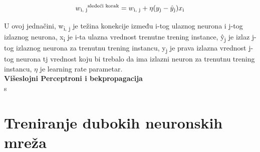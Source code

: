 \documentclass[a4paper,12pt]{report}
\begin{document}
\begin{equation}\label{eq:perceptronlearningrule}
w\textsubscript{i, j}\textsuperscript{sledeći korak} = w\textsubscript{i, j} + \eta (y\textsubscript{j} - \hat{y}\textsubscript{j})x\textsubscript{i}
\end{equation}

U ovoj jednačini, w\textsubscript{i, j} je težina konekcije između i-tog ulaznog neurona i j-tog izlaznog neurona, x\textsubscript{i} je i-ta ulazna vrednost trenutne trening instance, \^y\textsubscript{j} je izlaz j-tog izlaznog neurona za trenutnu trening instancu, y\textsubscript{j} je prava izlazna vrednost j-tog neurona tj vrednost koju bi trebalo da ima izlazni neuron za trenutnu trening instancu, $\eta$ je learning rate parametar.\\

\textbf{Višeslojni Perceptroni i bekpropagacija}\\s

\section{Treniranje dubokih neuronskih mreža}
\end{document}
